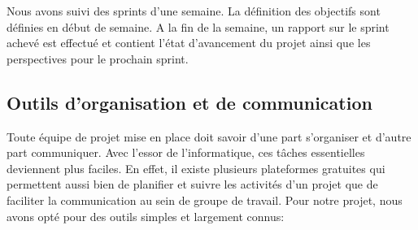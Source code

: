     Nous avons suivi des sprints d'une semaine. La définition des objectifs sont définies en début de semaine. A la fin de la semaine, un rapport sur le sprint achevé est effectué et contient l'état d'avancement du projet ainsi que les perspectives pour le prochain sprint.

    \subsection{Outils d'organisation et de communication}
        Toute équipe de projet mise en place doit savoir d’une part s’organiser et d’autre part communiquer. Avec l’essor de l’informatique, ces tâches essentielles deviennent plus faciles. En effet, il existe plusieurs plateformes gratuites qui permettent aussi bien de planifier et suivre les activités d’un projet que de faciliter la communication au sein de groupe de travail. Pour notre projet, nous avons opté pour des outils simples et largement connus:

